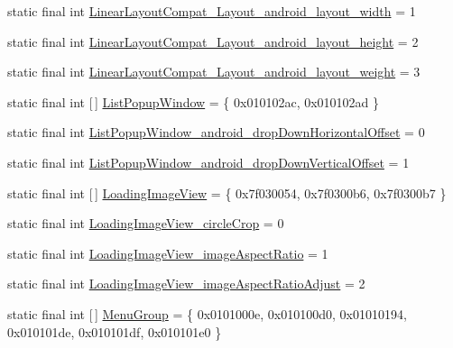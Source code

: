 \begin{DoxyCompactItemize}
\item 
static final int \mbox{\hyperlink{classcom_1_1google_1_1android_1_1gms_1_1R_1_1styleable_ac56b72de84229372c0954c8d79301235}{Linear\+Layout\+Compat\+\_\+\+Layout\+\_\+android\+\_\+layout\+\_\+width}} = 1
\item 
static final int \mbox{\hyperlink{classcom_1_1google_1_1android_1_1gms_1_1R_1_1styleable_a0f3a992fef444a9c733fc565f8bd7dee}{Linear\+Layout\+Compat\+\_\+\+Layout\+\_\+android\+\_\+layout\+\_\+height}} = 2
\item 
static final int \mbox{\hyperlink{classcom_1_1google_1_1android_1_1gms_1_1R_1_1styleable_a58b17a03096ea2aca786c06e1320d9ee}{Linear\+Layout\+Compat\+\_\+\+Layout\+\_\+android\+\_\+layout\+\_\+weight}} = 3
\item 
static final int \mbox{[}$\,$\mbox{]} \mbox{\hyperlink{classcom_1_1google_1_1android_1_1gms_1_1R_1_1styleable_a8f10db217781c8226564eb0534905eb5}{List\+Popup\+Window}} = \{ 0x010102ac, 0x010102ad \}
\item 
static final int \mbox{\hyperlink{classcom_1_1google_1_1android_1_1gms_1_1R_1_1styleable_a5e7d87364a1cc488d306a062f3de0e5d}{List\+Popup\+Window\+\_\+android\+\_\+drop\+Down\+Horizontal\+Offset}} = 0
\item 
static final int \mbox{\hyperlink{classcom_1_1google_1_1android_1_1gms_1_1R_1_1styleable_ac9de8f3ad94176a5475f8b634926df42}{List\+Popup\+Window\+\_\+android\+\_\+drop\+Down\+Vertical\+Offset}} = 1
\item 
static final int \mbox{[}$\,$\mbox{]} \mbox{\hyperlink{classcom_1_1google_1_1android_1_1gms_1_1R_1_1styleable_af7c01f6f79a08068502e66bd8cc226fa}{Loading\+Image\+View}} = \{ 0x7f030054, 0x7f0300b6, 0x7f0300b7 \}
\item 
static final int \mbox{\hyperlink{classcom_1_1google_1_1android_1_1gms_1_1R_1_1styleable_a31abe75fc61988603740835ac9ced6a8}{Loading\+Image\+View\+\_\+circle\+Crop}} = 0
\item 
static final int \mbox{\hyperlink{classcom_1_1google_1_1android_1_1gms_1_1R_1_1styleable_a9b3e4fd0d70515bf94e702549684e818}{Loading\+Image\+View\+\_\+image\+Aspect\+Ratio}} = 1
\item 
static final int \mbox{\hyperlink{classcom_1_1google_1_1android_1_1gms_1_1R_1_1styleable_ab370f90a1fb264a3b5a100e01b752d1d}{Loading\+Image\+View\+\_\+image\+Aspect\+Ratio\+Adjust}} = 2
\item 
static final int \mbox{[}$\,$\mbox{]} \mbox{\hyperlink{classcom_1_1google_1_1android_1_1gms_1_1R_1_1styleable_a701097febd7d122ab7fc1954e6e9822f}{Menu\+Group}} = \{ 0x0101000e, 0x010100d0, 0x01010194, 0x010101de, 0x010101df, 0x010101e0 \}

\end{DoxyCompactItemize}
